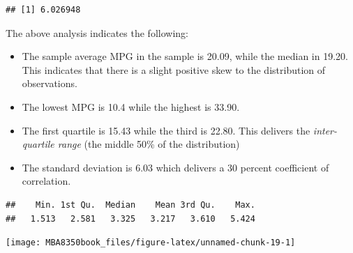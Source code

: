 \documentclass[
]{book}
\newenvironment{Shaded}{\begin{snugshade}}{\end{snugshade}}
\newcommand{\AttributeTok}[1]{\textcolor[rgb]{0.77,0.63,0.00}{#1}}
\newcommand{\CommentTok}[1]{\textcolor[rgb]{0.56,0.35,0.01}{\textit{#1}}}
\newcommand{\DecValTok}[1]{\textcolor[rgb]{0.00,0.00,0.81}{#1}}
\newcommand{\DocumentationTok}[1]{\textcolor[rgb]{0.56,0.35,0.01}{\textbf{\textit{#1}}}}
\newcommand{\FunctionTok}[1]{\textcolor[rgb]{0.00,0.00,0.00}{#1}}
\newcommand{\NormalTok}[1]{#1}
\newcommand{\SpecialCharTok}[1]{\textcolor[rgb]{0.00,0.00,0.00}{#1}}
\newcommand{\StringTok}[1]{\textcolor[rgb]{0.31,0.60,0.02}{#1}}
\begin{document}
\begin{Shaded}
\end{Shaded}

\begin{verbatim}
## [1] 6.026948
\end{verbatim}

The above analysis indicates the following:

\begin{itemize}
\item
  The sample average MPG in the sample is 20.09, while the median in 19.20. This indicates that there is a slight positive skew to the distribution of observations.
\item
  The lowest MPG is 10.4 while the highest is 33.90.
\item
  The first quartile is 15.43 while the third is 22.80. This delivers the \emph{inter-quartile range} (the middle 50\% of the distribution)
\item
  The standard deviation is 6.03 which delivers a 30 percent coefficient of correlation.
\end{itemize}

\begin{Shaded}
\end{Shaded}

\begin{verbatim}
##    Min. 1st Qu.  Median    Mean 3rd Qu.    Max. 
##   1.513   2.581   3.325   3.217   3.610   5.424
\end{verbatim}

\begin{Shaded}
\end{Shaded}

\begin{center}\texttt{[image: MBA8350book\_files/figure-latex/unnamed-chunk-19-1]} \end{center}
\end{document}
